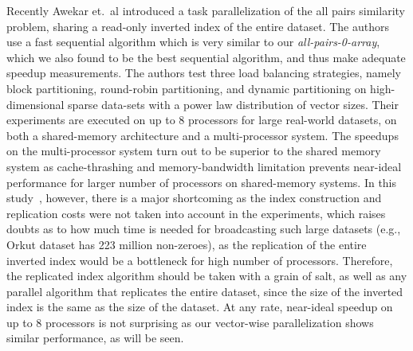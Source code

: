 \documentclass{comjnl}
\newcommand{\var}[1]{\mbox{\textsl{#1}}} %
\begin{document}
Recently Awekar et.~al \cite{awekar2010} introduced a task parallelization of the all
pairs similarity problem, sharing a read-only inverted index of the
entire dataset.  The authors use a fast sequential
algorithm which is very similar to our \var{all-pairs-0-array}, which we
also found to be the best sequential algorithm, and thus make adequate
speedup measurements. The authors test three load balancing
strategies, namely block partitioning, round-robin partitioning, and
dynamic partitioning on high-dimensional sparse data-sets with a power
law distribution of vector sizes. Their experiments are executed on up
to 8 processors for large real-world datasets, on both a shared-memory
architecture and a multi-processor system. The speedups on the
multi-processor system turn out to be superior to the shared memory
system as cache-thrashing and memory-bandwidth limitation prevents
near-ideal performance for larger number of processors on
shared-memory systems.  In this study~\cite{awekar2010},  however, there is a major
shortcoming as the index construction and replication costs were not
taken into account in the experiments, which raises doubts as to how
much time is needed for broadcasting such large datasets (e.g., Orkut
dataset has 223 million non-zeroes), as the replication of the entire
inverted index would be a bottleneck for high number of
processors. Therefore, the replicated index algorithm should be taken
with a grain of salt, as well as any parallel algorithm that
replicates the entire dataset, since the size of the inverted index is
the same as the size of the dataset.  At any rate, near-ideal speedup
on up to $8$ processors is not surprising as our vector-wise 
parallelization shows similar performance, as will be seen.
\end{document}
